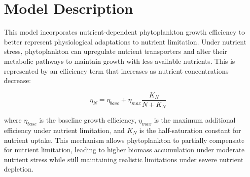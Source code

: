 \section{Model Description}

This model incorporates nutrient-dependent phytoplankton growth efficiency to better represent physiological adaptations to nutrient limitation. Under nutrient stress, phytoplankton can upregulate nutrient transporters and alter their metabolic pathways to maintain growth with less available nutrients. This is represented by an efficiency term that increases as nutrient concentrations decrease:

\[ \eta_N = \eta_{base} + \eta_{max} \frac{K_N}{N + K_N} \]

where $\eta_{base}$ is the baseline growth efficiency, $\eta_{max}$ is the maximum additional efficiency under nutrient limitation, and $K_N$ is the half-saturation constant for nutrient uptake. This mechanism allows phytoplankton to partially compensate for nutrient limitation, leading to higher biomass accumulation under moderate nutrient stress while still maintaining realistic limitations under severe nutrient depletion.
